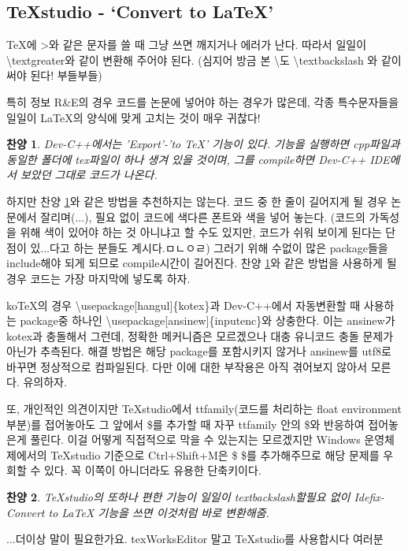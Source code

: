 \documentclass[11pt]{article}
\newtheorem{praise}{찬양}
\begin{document}
\subsection{TeXstudio - \textquoteleft Convert to LaTeX\textquoteright}
TeX에 \textgreater 와 같은 문자를 쓸 때 그냥 쓰면 깨지거나 에러가 난다. 따라서 일일이 \textbackslash textgreater와 같이 변환해 주어야 된다. (심지어 방금 본 \textbackslash 도 \textbackslash textbackslash 와 같이 써야 된다! 부들부들)

특히 정보 R\&E의 경우 코드를 논문에 넣어야 하는 경우가 많은데, 각종 특수문자들을 일일이 LaTeX의 양식에 맞게 고치는 것이 매우 귀찮다!

\begin{praise}
	Dev-C++에서는 'Export'-'to TeX' 기능이 있다. 기능을 실행하면 cpp파일과 동일한 폴더에 tex파일이 하나 생겨 있을 것이며, 그를 compile하면 Dev-C++ IDE에서 보았던 그대로 코드가 나온다.\label{Dev-C++}
\end{praise} 

하지만 찬양 \ref{Dev-C++}와 같은 방법을 추천하지는 않는다. 코드 중 한 줄이 길어지게 될 경우 논문에서 잘리며(...), 필요 없이 코드에 색다른 폰트와 색을 넣어 놓는다. (코드의 가독성을 위해 색이 있어야 하는 것 아니냐고 할 수도 있지만, 코드가 쉬워 보이게 된다는 단점이 있...다고 하는 분들도 계시다.ㅁㄴㅇㄹ) 그러기 위해 수없이 많은 package들을 include해야 되게 되므로 compile시간이 길어진다. 찬양 \ref{Dev-C++}와 같은 방법을 사용하게 될 경우 코드는 가장 마지막에 넣도록 하자.

koTeX의 경우 \textbackslash usepackage[hangul]\{kotex\}과 Dev-C++에서 자동변환할 때 사용하는 package중 하나인 \textbackslash usepackage[ansinew]\{inputenc\}와 상충한다. 이는 ansinew가 kotex과 충돌해서 그런데, 정확한 메커니즘은 모르겠으나 대충 유니코드 충돌 문제가 아닌가 추측된다. 해결 방법은 해당 package를 포함시키지 않거나 ansinew를 utf8로 바꾸면 정상적으로 컴파일된다. 다만 이에 대한 부작용은 아직 겪어보지 않아서 모른다. 유의하자.

또, 개인적인 의견이지만 TeXstudio에서 ttfamily(코드를 처리하는 float environment 부분)를 접어놓아도 그 앞에서 \$를 추가할 때 자꾸 ttfamily 안의 \$와 반응하여 접어놓은게 풀린다. 이걸 어떻게 직접적으로 막을 수 있는지는 모르겠지만 Windows 운영체제에서의 TeXstudio 기준으로 Ctrl+Shift+M은 \$ \$를 추가해주므로 해당 문제를 우회할 수 있다. 꼭 이쪽이 아니더라도 유용한 단축키이다.

\begin{praise}
	TeXstudio의 또하나 편한 기능이 일일이 textbackslash할필요 없이 Idefix-Convert to LaTeX 기능을 쓰면 이것처럼 바로 변환해줌.
\end{praise}
...더이상 말이 필요한가요. texWorksEditor 말고 TeXstudio를 사용합시다 여러분
\end{document}
